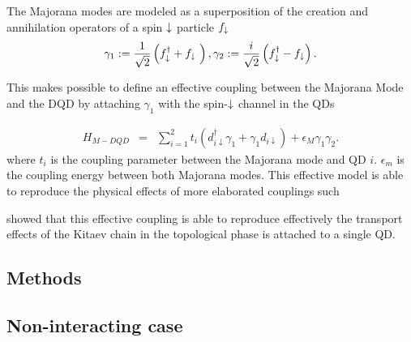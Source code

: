 \documentclass[showpacs,aps,prb,reprint,superscriptaddress]{revtex4-1}
\newcommand{\Jesus}[1]{\textcolor{red}{\fbox{Jesus} {\sl#1}}}
\begin{document}
The Majorana modes are modeled as a superposition of the creation and annihilation operators of a spin $\downarrow$ particle $f_\downarrow$
\begin{equation}
    \gamma_1 := \frac{1}{\sqrt{2}} \left( f^\dagger_{\downarrow} + f_{\downarrow}\ \right) , \gamma_2 := \frac{i}{\sqrt{2}} \left( f^\dagger_{\downarrow} - f_{\downarrow} \right). \label{eq:MajOp}
\end{equation}


This makes possible to define an effective coupling between the Majorana Mode and the DQD by attaching $\gamma_1$ with the spin-$\downarrow$ channel in the QDs

\begin{eqnarray}
H_{M-DQD} & = &  \sum_{i=1}^2t_{i} \left(d_{i\downarrow}^{\dagger}\gamma_{1}+\gamma_{1}d_{i\downarrow}\right) + \epsilon_M \gamma_1\gamma_2. 
\label{eq:H_MDQD}
\end{eqnarray}
where $t_i$ is the coupling parameter between the Majorana mode and QD $i$. $\epsilon_m$ is the coupling energy between both Majorana modes. This effective model is able to reproduce the physical effects of more elaborated couplings \cite{ruiz-tijerina_interaction_2015} such 

\citeauthor{ruiz-tijerina_interaction_2015}  showed that this effective coupling  is able to reproduce effectively the transport effects of  the Kitaev chain in the topological phase is attached to a single QD.  \\








 
\subsection{Methods}

\subsection{Non-interacting case \label{sec:non-interactingMethods}}
\end{document}
